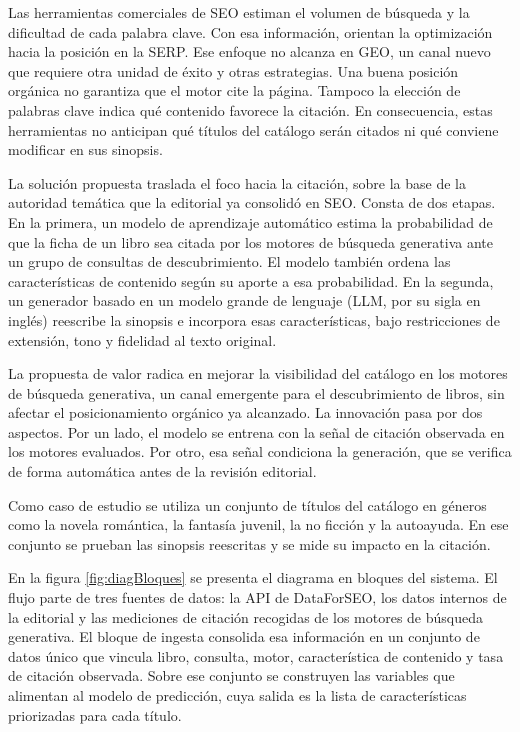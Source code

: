 \documentclass[
11pt, %
codirector, %
]{charter}
\begin{document}
Las herramientas comerciales de SEO estiman el volumen de búsqueda y la dificultad de cada palabra clave. Con esa información, orientan la optimización hacia la posición en la SERP. Ese enfoque no alcanza en GEO, un canal nuevo que requiere otra unidad de éxito y otras estrategias. Una buena posición orgánica no garantiza que el motor cite la página. Tampoco la elección de palabras clave indica qué contenido favorece la citación. En consecuencia, estas herramientas no anticipan qué títulos del catálogo serán citados ni qué conviene modificar en sus sinopsis.

La solución propuesta traslada el foco hacia la citación, sobre la base de la autoridad temática que la editorial ya consolidó en SEO. Consta de dos etapas. En la primera, un modelo de aprendizaje automático estima la probabilidad de que la ficha de un libro sea citada por los motores de búsqueda generativa ante un grupo de consultas de descubrimiento. El modelo también ordena las características de contenido según su aporte a esa probabilidad. En la segunda, un generador basado en un modelo grande de lenguaje (LLM, por su sigla en inglés) reescribe la sinopsis e incorpora esas características, bajo restricciones de extensión, tono y fidelidad al texto original.

La propuesta de valor radica en mejorar la visibilidad del catálogo en los motores de búsqueda generativa, un canal emergente para el descubrimiento de libros, sin afectar el posicionamiento orgánico ya alcanzado. La innovación pasa por dos aspectos. Por un lado, el modelo se entrena con la señal de citación observada en los motores evaluados. Por otro, esa señal condiciona la generación, que se verifica de forma automática antes de la revisión editorial.

Como caso de estudio se utiliza un conjunto de títulos del catálogo en géneros como la novela romántica, la fantasía juvenil, la no ficción y la autoayuda. En ese conjunto se prueban las sinopsis reescritas y se mide su impacto en la citación.

En la figura \ref{fig:diagBloques} se presenta el diagrama en bloques del sistema. El flujo parte de tres fuentes de datos: la API de DataForSEO, los datos internos de la editorial y las mediciones de citación recogidas de los motores de búsqueda generativa. El bloque de ingesta consolida esa información en un conjunto de datos único que vincula libro, consulta, motor, característica de contenido y tasa de citación observada. Sobre ese conjunto se construyen las variables que alimentan al modelo de predicción, cuya salida es la lista de características priorizadas para cada título.
\end{document}
